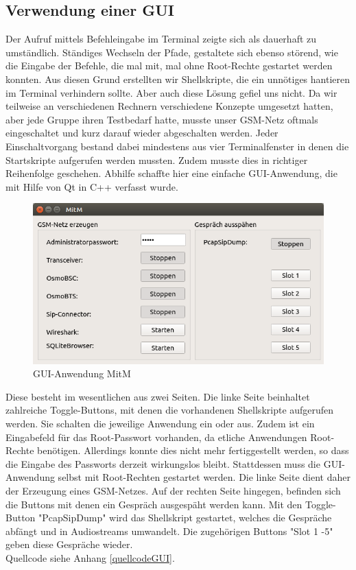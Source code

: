 
\subsection{Verwendung einer GUI}

Der Aufruf mittels Befehleingabe im Terminal zeigte sich als dauerhaft zu umständlich. Ständiges Wechseln der Pfade, gestaltete sich ebenso störend, wie die Eingabe der Befehle, die mal mit, mal ohne Root-Rechte gestartet werden konnten. Aus diesen Grund erstellten wir Shellskripte, die ein unnötiges hantieren im Terminal verhindern sollte. Aber auch diese Lösung gefiel uns nicht. Da wir teilweise an verschiedenen Rechnern verschiedene Konzepte umgesetzt hatten, aber jede Gruppe ihren Testbedarf hatte, musste unser GSM-Netz oftmals eingeschaltet und kurz darauf wieder abgeschalten werden. Jeder Einschaltvorgang bestand dabei mindestens aus vier Terminalfenster in denen die Startskripte aufgerufen werden mussten. Zudem musste dies in richtiger Reihenfolge geschehen. Abhilfe schaffte hier eine einfache GUI-Anwendung, die mit Hilfe von Qt in C++ verfasst wurde.  

\begin{figure}[h] %
\centering
\includegraphics[width=15cm]{includes/gui}
\caption{GUI-Anwendung MitM}
\label{fig:GUI}
\end{figure}


Diese besteht im wesentlichen aus zwei Seiten. Die linke Seite beinhaltet zahlreiche Toggle-Buttons, mit denen die vorhandenen Shellskripte aufgerufen werden. Sie schalten die jeweilige Anwendung ein oder aus. Zudem ist ein Eingabefeld für das Root-Passwort vorhanden, da etliche Anwendungen Root-Rechte benötigen. Allerdings konnte dies nicht mehr fertiggestellt werden, so dass die Eingabe des Passworts derzeit wirkungslos bleibt. Stattdessen muss die GUI-Anwendung selbst mit Root-Rechten gestartet werden. Die linke Seite dient daher der Erzeugung eines GSM-Netzes. 
Auf der rechten Seite hingegen, befinden sich die Buttons mit denen ein Gespräch ausgespäht werden kann. Mit den Toggle-Button "PcapSipDump" wird das Shellskript gestartet, welches die Gespräche abfängt und in Audiostreams umwandelt. Die zugehörigen Buttons "Slot 1 -5" geben diese Gespräche wieder. \\

Quellcode siehe Anhang \ref{quellcodeGUI}.